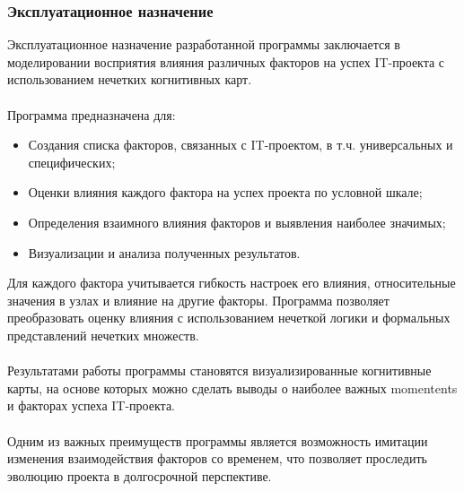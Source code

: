 \documentclass{article}
\begin{document}
    \subsubsection {Эксплуатационное назначение}
    Эксплуатационное назначение разработанной программы заключается в моделировании восприятия влияния различных факторов на успех IT-проекта с использованием нечетких когнитивных карт.\\
    ~\\
    Программа предназначена для:
    \begin{itemize}
        \item Создания списка факторов, связанных с IT-проектом, в т.ч. универсальных и специфических;
        \item Оценки влияния каждого фактора на успех проекта по условной шкале;
        \item Определения взаимного влияния факторов и выявления наиболее значимых;
        \item Визуализации и анализа полученных результатов.
    \end{itemize}
    Для каждого фактора учитывается гибкость настроек его влияния, относительные значения в узлах и влияние на другие факторы. Программа позволяет преобразовать оценку влияния с использованием нечеткой логики и формальных представлений нечетких множеств.\\
    ~\\
    Результатами работы программы становятся визуализированные когнитивные карты, на основе которых можно сделать выводы о наиболее важных momentents и факторах успеха IT-проекта.\\
    ~\\
    Одним из важных преимуществ программы является возможность имитации изменения взаимодействия факторов со временем, что позволяет проследить эволюцию проекта в долгосрочной перспективе.
\end{document}
